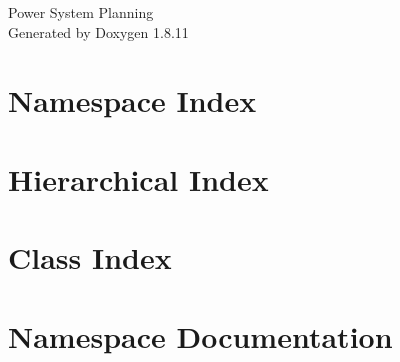 \documentclass[twoside]{book}
\newcommand{\+}{\discretionary{\mbox{\scriptsize$\hookleftarrow$}}{}{}}
\newcommand{\clearemptydoublepage}{%
  \newpage{\pagestyle{empty}\cleardoublepage}%
}
\begin{document}
\hypersetup{pageanchor=false,
             bookmarksnumbered=true,
             pdfencoding=unicode
            }
\begin{titlepage}
\vspace*{7cm}
\begin{center}%
{\Large Power System Planning }\\
\vspace*{1cm}
{\large Generated by Doxygen 1.8.11}\\
\end{center}
\end{titlepage}
\clearemptydoublepage
\tableofcontents
\clearemptydoublepage
{}
\hypersetup{pageanchor=true}

\chapter{Namespace Index}

\chapter{Hierarchical Index}

\chapter{Class Index}

\chapter{Namespace Documentation}




\end{document}
